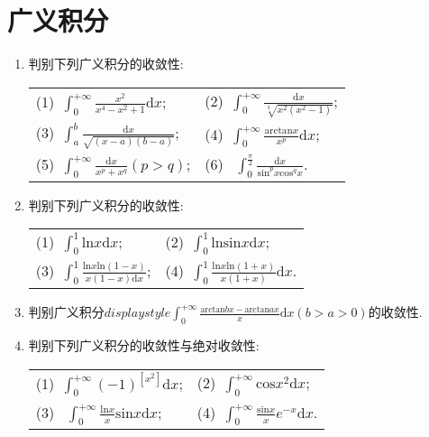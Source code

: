 \section{广义积分}
\begin{enumerate}
	\item 判别下列广义积分的收敛性:
	\begin{table}[H]
		\begin{tabular}{ll}
		(1)\ $\displaystyle{\int_{0}^{+\infty}\frac{x^2}{x^4-x^2+1}\mathrm{d}x}$;\qquad \qquad \qquad \qquad&(2)\ $\displaystyle{\int_{0}^{+\infty}\frac{\mathrm{d}x}{\sqrt[3]{x^2(x^2-1)}}}$;\\
		(3)\ $\displaystyle{\int_{a}^{b}\frac{\mathrm{d}x}{\sqrt{(x-a)(b-a)}}}$;\qquad \qquad \qquad \qquad&(4)\ $\displaystyle{\int_{0}^{+\infty}\frac{\mathrm{arctan}x}{x^p}\mathrm{d}x}$;\\
		(5)\ $\displaystyle{\int_{0}^{+\infty}\frac{\mathrm{d}x}{x^p+x^q}(p>q)}$;\qquad \qquad \qquad&
		(6) \ $\displaystyle{\int_{0}^{\frac{\pi}{2}}\frac{\mathrm{d}x}{\mathrm{sin}^px\mathrm{cos}^qx}}$.
		\end{tabular}
	\end{table}
	\item 判别下列广义积分的收敛性:
		\begin{table}[H]
		\begin{tabular}{ll}
			(1)\ $\displaystyle{\int_{0}^{1}\mathrm{ln}x\mathrm{d}x}$;\qquad \qquad \qquad \qquad&(2)\ $\displaystyle{\int_{0}^{1}\mathrm{ln}\mathrm{sin}x\mathrm{d}x};$\\(3)\ $\displaystyle{\int_{0}^{1}\frac{\mathrm{ln}x\mathrm{ln}(1-x)}{x(1-x)\mathrm{d}x}}$;\qquad \qquad \qquad \qquad&(4)\ $\displaystyle{\int_{0}^{1}\frac{\mathrm{ln}x\mathrm{ln}(1+x)}{x(1+x)}\mathrm{d}x}$.
		\end{tabular}
	\end{table}
\item 判别广义积分$displaystyle{\int_{0}^{+\infty}\frac{\mathrm{arctan}bx-\mathrm{arctan}ax}{x}\mathrm{d}x}(b>a>0)$的收敛性.
\item 判别下列广义积分的收敛性与绝对收敛性:
\begin{table}[H]
	\begin{tabular}{ll}
		(1)\ $\displaystyle{\int_{0}^{+\infty}(-1)^{[x^2]}\mathrm{d}x}$;\qquad \qquad \qquad \qquad&(2)\ $\displaystyle{\int_{0}^{+\infty}\mathrm{cos}x^2\mathrm{d}x}$;\\
		(3) \ $\displaystyle{\int_{0}^{+\infty}\frac{\mathrm{ln}x}{x}\mathrm{sin}x\mathrm{d}x}$;\qquad \qquad \qquad \qquad&(4)\ $\displaystyle{\int_{0}^{+\infty}\frac{\mathrm{sin}x}{x}e^{-x}\mathrm{d}x}$.

\end{tabular}
\end{table}
\end{enumerate}

